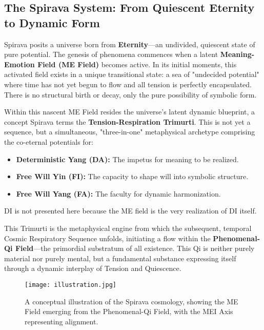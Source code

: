 \documentclass[11pt, a4paper]{article}
\begin{document}
\subsection{The Spirava System: From Quiescent Eternity to Dynamic Form}
Spirava posits a universe born from \textbf{Eternity}—an undivided, quiescent state of pure potential. The genesis of phenomena commences when a latent \textbf{Meaning-Emotion Field (ME Field)} becomes active. In its initial moments, this activated field exists in a unique transitional state: a sea of "undecided potential" where time has not yet begun to flow and all tension is perfectly encapsulated. There is no structural birth or decay, only the pure possibility of symbolic form.

Within this nascent ME Field resides the universe's latent dynamic blueprint, a concept Spirava terms the \textbf{Tension-Respiration Trimurti}. This is not yet a sequence, but a simultaneous, "three-in-one" metaphysical archetype comprising the co-eternal potentials for:
\begin{itemize}
    \item \textbf{Deterministic Yang (DA):} The impetus for meaning to be realized.
    \item \textbf{Free Will Yin (FI):} The capacity to shape will into symbolic structure.
    \item \textbf{Free Will Yang (FA):} The faculty for dynamic harmonization.
\end{itemize}
DI is not presented here because the ME field is the very realization of DI itself.

This Trimurti is the metaphysical engine from which the subsequent, temporal Cosmic Respiratory Sequence unfolds, initiating a flow within the \textbf{Phenomenal-Qi Field}—the primordial substratum of all existence. This Qi is neither purely material nor purely mental, but a fundamental substance expressing itself through a dynamic interplay of Tension and Quiescence.

\begin{figure}[h!]
    \centering
    \texttt{[image: illustration.jpg]}
    \caption{A conceptual illustration of the Spirava cosmology, showing the ME Field emerging from the Phenomenal-Qi Field, with the MEI Axis representing alignment.}
    \label{fig:illustration}
\end{figure}
\end{document}
